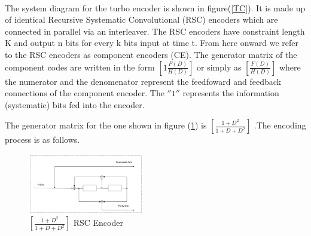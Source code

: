 \documentclass[twocolumn]{article}
\begin{document}
\paragraph{}The system diagram for the turbo encoder is shown in figure(\ref{TC}).
 It is made up of identical Recursive Systematic Convolutional (RSC) encoders which 
 are connected
  in parallel via an interleaver. The RSC encoders have constraint length K and output
  n bits for every k bits input at time t.
  From here onward we refer to the RSC encoders as component 
encoders (CE). The generator matrix of the component codes are written in 
the form $[1 \frac{F(D)}{H(D)}]$ or simply as $[\frac{F(D)}{H(D)}]$
where the numerator and the denomenator represent the feedfoward and feedback
 connections of the component encoder. The $''1''$ represents the information 
 (systematic) bits fed into the encoder.

 The generator matrix for the one shown in figure (\ref{RSC})
 is $[\frac{1+D^2}{1+D+D^2}]$ .The encoding process is as follows.

\begin{figure}[h!]
\centering
		\includegraphics[width=0.45\textwidth]{RSCExample3.pdf}
		\caption{$[\frac{1+D^2}{1+D+D^2}]$  RSC Encoder}
		\label{RSC}
		\end{figure}
\end{document}
